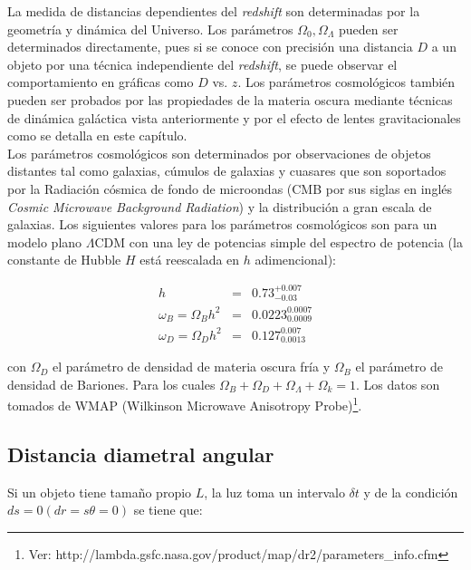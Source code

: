 La medida de distancias dependientes del \emph{redshift} son determinadas por la geometría y dinámica del Universo. Los parámetros $\Omega_{0} , \Omega_{\Lambda}$ pueden ser determinados directamente, pues si se conoce con precisión una distancia $D$ a un objeto por una técnica independiente del \emph{redshift}, se puede observar el comportamiento en gráficas como $D$ vs. $z$. Los parámetros cosmológicos también pueden ser probados por las propiedades de la materia oscura mediante técnicas de dinámica galáctica vista anteriormente y por el efecto de lentes gravitacionales como se detalla en este capítulo.\\


Los parámetros cosmológicos son determinados por observaciones de objetos distantes tal como galaxias, cúmulos de galaxias y cuasares que son soportados por la Radiación cósmica de fondo de microondas  (CMB por sus siglas en inglés \emph{Cosmic Microwave Background Radiation}) y la distribución a gran escala de galaxias. Los siguientes valores para los parámetros cosmológicos son para un modelo plano $\Lambda$CDM con una ley de potencias simple del espectro de potencia (la constante de Hubble $H$ está reescalada en $h$ adimencional):

\begin{eqnarray}
 h &=& 0.73_{-0.03}^{+0.007} \\
 \omega_B = \Omega_B h^2 &=& 0.0223_{0.0009}^{0.0007} \\
  \omega_D = \Omega_D h^2 &=& 0.127_{0.0013}^{0.007}
\end{eqnarray}

con $\Omega_D$ el parámetro de densidad de materia oscura fría y  $\Omega_B$ el parámetro de densidad de Bariones. Para los cuales $\Omega_B + \Omega_D + \Omega_{\Lambda} +\Omega_k= 1$. Los datos son tomados de WMAP (Wilkinson Microwave Anisotropy Probe)\footnote{Ver: http://lambda.gsfc.nasa.gov/product/map/dr2/parameters\_info.cfm}.




\subsection{Distancia diametral angular}

Si un objeto tiene tamaño propio $L$, la luz toma un intervalo $\delta t$ y de la condición $ds = 0 (dr = s\theta = 0)$ se tiene que:


